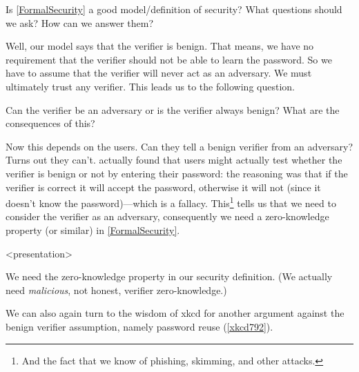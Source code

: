 \begin{frame}
  \begin{exercise}
    Is \cref{FormalSecurity} a good model/definition of security?
    What questions should we ask?
    How can we answer them?
  \end{exercise}
\end{frame}

Well, our model says that the verifier is benign.
That means, we have no requirement that the verifier should not be able to 
learn the password.
So we have to assume that the verifier will never act as an adversary.
We must ultimately trust any verifier.
This leads us to the following question.

\begin{frame}
  \begin{question}
    Can the verifier be an adversary or is the verifier always benign?
    What are the consequences of this?
  \end{question}
\end{frame}

Now this depends on the users.
Can they tell a benign verifier from an adversary?
Turns out they can't\autocite{WhyPhishingWorks}.
 actually found that users might actually test 
whether the verifier is benign or not by entering their password:
the reasoning was that if the verifier is correct it will accept the password, 
otherwise it will not (since it doesn't know the password)---which is a 
fallacy.
This\footnote{%
  And the fact that we know of phishing, skimming, and other attacks.
} tells us that we need to consider the verifier as an adversary, consequently 
we need a zero-knowledge property (or similar) in \cref{FormalSecurity}.

\begin{frame}<presentation>
  \begin{example}
  \end{example}

  \pause

  \begin{example}[Consequences]
    We need the zero-knowledge property in our security definition.
    (We actually need \emph{malicious}, not honest, verifier zero-knowledge.)
  \end{example}
\end{frame}

We can also again turn to the wisdom of xkcd for another argument against the 
benign verifier assumption, namely password reuse (\cref{xkcd792}).

